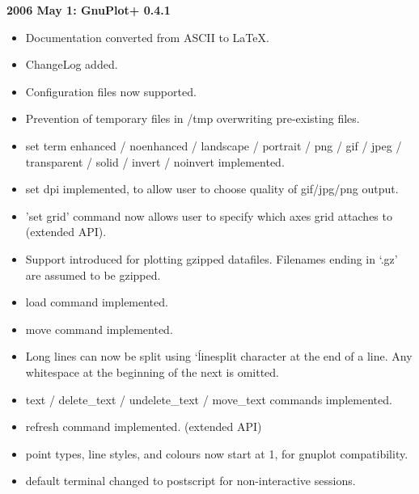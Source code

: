 \documentclass[a4paper,onecolumn,11pt]{book}
\begin{document}
\noindent \textbf{2006 May 1: GnuPlot+ 0.4.1}
\begin{itemize}
\item Documentation converted from ASCII to LaTeX.
\item ChangeLog added.
\item Configuration files now supported.
\item Prevention of temporary files in /tmp overwriting pre-existing files.
\item set term enhanced / noenhanced / landscape / portrait / png / gif / jpeg / transparent / solid / invert / noinvert implemented.
\item set dpi implemented, to allow user to choose quality of gif/jpg/png output.
\item 'set grid' command now allows user to specify which axes grid attaches to (extended API).
\item Support introduced for plotting gzipped datafiles. Filenames ending in `.gz' are assumed to be gzipped.
\item load command implemented.
\item move command implemented.
\item Long lines can now be split using `\' linesplit character at the end of a line. Any whitespace at the beginning of the next is omitted.
\item text / delete\_text / undelete\_text / move\_text commands implemented.
\item refresh command implemented. (extended API)
\item point types, line styles, and colours now start at 1, for gnuplot compatibility.
\item default terminal changed to postscript for non-interactive sessions.
\end{itemize}
\end{document}
